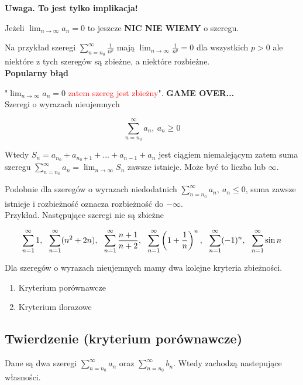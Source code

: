 \textbf{Uwaga. To jest tylko implikacja!}

Jeżeli $ \lim_{n \to \infty} a_n = 0 $ to jeszcze \textbf{NIC NIE WIEMY} o szeregu.

Na przykład szeregi $ \sum\limits_{n = n_0}^{\infty} \frac{1}{n^p} $ mają $ \lim_{n \to \infty} \frac{1}{n^p} = 0 $
dla wszystkich $ p > 0 $ ale niektóre z tych szeregów są zbieżne, a niektóre rozbieżne. \\

\textbf{Popularny błąd}

"$\lim_{n \to \infty} a_n = 0 $ \textcolor{red}{zatem szereg jest zbieżny}". \textbf{GAME OVER...} \\

Szeregi o wyrazach nieujemnych

$$ \sum\limits_{n = n_0}^{\infty} a_n, \ a_n \geq 0 $$

Wtedy $ S_n = a_{n_0} + a_{n_0 + 1} + ... + a_{n - 1} + a_n $ jest ciągiem niemalejącym zatem suma szeregu
$ \sum\limits_{n = n_0}^{\infty} a_n = \lim_{n \to \infty} S_n $ zawsze istnieje. Może być to liczba lub $\infty$.

Podobnie dla szeregów o wyrazach niedodatnich $ \sum\limits_{n = n_0}^{\infty} a_n, \ a_n \leq 0 $, suma zawsze istnieje
i rozbieżność oznacza rozbieżność do $-\infty$. \\

Przykład. Następujące szeregi nie są zbieżne

$$ \suminfty{1} 1, \ \ \suminfty{1} (n^2 + 2n), \ \
\suminfty{1} \frac{n+1}{n+2}, \ \ \suminfty{1} \left(1 + \frac{1}{n} \right)^n , \ \ 
\suminfty{1} (-1)^n , \ \ \suminfty{1} \sin n$$

Dla szeregów o wyrazach nieujemnych mamy dwa kolejne kryteria zbieżności.

\begin{enumerate}
    \item Kryterium porównawcze
    \item Kryterium ilorazowe \\
\end{enumerate} 

\subsection*{Twierdzenie (kryterium porównawcze)}

Dane są dwa szeregi $ \sum\limits_{n = n_0}^{\infty} a_n $ oraz $ \sum\limits_{n = n_0}^{\infty} b_n $. Wtedy zachodzą nastepujące
własności.

